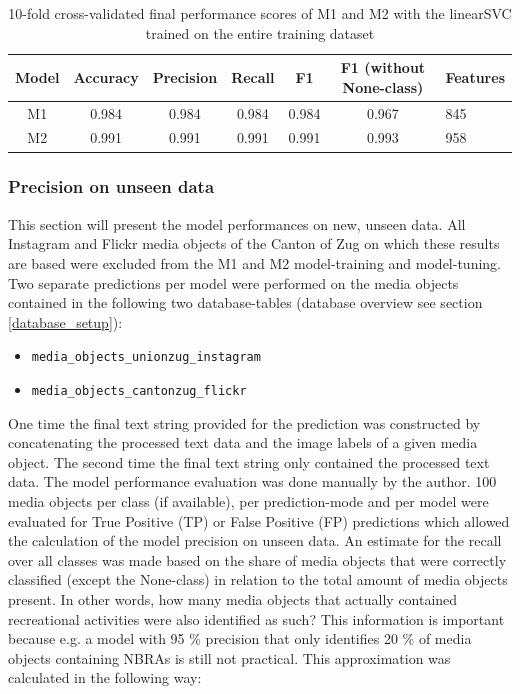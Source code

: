 \begin{table}[!htb]
\begin{center}
\caption{10-fold cross-validated final performance scores of M1 and M2 with the linearSVC trained on the entire training dataset}\vspace{1ex}
\label{tab:m1_m2_linearSVC_final_scores}
\begin{tabular}{cccccc}\hline
Model & Accuracy & Precision & Recall & F1 & F1 (without None-class) & Features\\ \hline
M1 & 0.984 & 0.984 & 0.984 & 0.984 & 0.967 & 845\\
M2 & 0.991 & 0.991 & 0.991 & 0.991 & 0.993 & 958\\ \hline
\end{tabular}
\end{center}
\end{table}

\subsubsection{Precision on unseen data} \label{precision_unseen_data}
This section will present the model performances on new, unseen data. All Instagram and Flickr media objects of the Canton of Zug on which these results are based were excluded from the M1 and M2 model-training and model-tuning. Two separate predictions per model were performed on the media objects contained in the following two database-tables (database overview see section \ref{database_setup}):

\begin{itemize}
    \item \texttt{media\_objects\_unionzug\_instagram} \item \texttt{media\_objects\_cantonzug\_flickr}
\end{itemize}

One time the final text string provided for the prediction was constructed by concatenating the processed text data and the image labels of a given media object. The second time the final text string only contained the processed text data. The model performance evaluation was done manually by the author. 100 media objects per class (if available), per prediction-mode and per model were evaluated for True Positive (TP) or False Positive (FP) predictions which allowed the calculation of the model precision on unseen data. An estimate for the recall over all classes was made based on the share of media objects that were correctly classified (except the None-class) in relation to the total amount of media objects present. In other words, how many media objects that actually contained recreational activities were also identified as such? This information is important because e.g. a model with 95 \% precision that only identifies 20 \% of media objects containing NBRAs is still not practical. This approximation was calculated in the following way:

